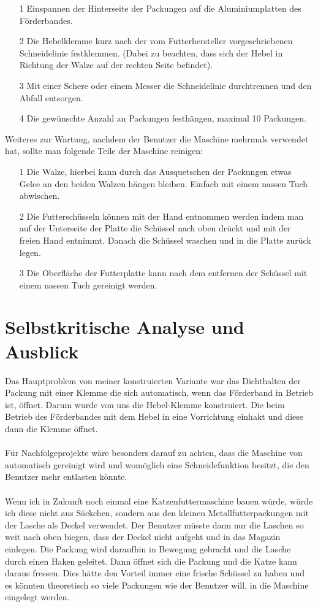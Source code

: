 \begin{itemize}
\item[1] Einspannen der Hinterseite der Packungen auf die Aluminiumplatten des Förderbandes. 
\item[2] Die Hebelklemme kurz nach der vom Futterhersteller vorgeschriebenen Schneidelinie festklemmen. (Dabei zu beachten, dass sich der Hebel in Richtung der Walze auf der rechten Seite befindet).
\item[3] Mit einer Schere oder einem Messer die Schneidelinie durchtrennen und den Abfall entsorgen.
\item[4] Die gewünschte Anzahl an Packungen festhängen, maximal 10 Packungen.
\end{itemize} 

Weiteres zur Wartung, nachdem der Benutzer die Maschine mehrmals verwendet hat, sollte man folgende Teile der Maschine reinigen: 

\begin{itemize}
\item[1] Die Walze, hierbei kann durch das Ausquetschen der Packungen etwas Gelee an den beiden Walzen hängen bleiben. Einfach mit einem nassen Tuch abwischen.
\item[2] Die Futterschüsseln können mit der Hand entnommen werden indem man auf der Unterseite der Platte die Schüssel nach oben drückt und mit der freien Hand entnimmt. Danach die Schüssel waschen und in die Platte zurück legen.
\item[3] Die Oberfläche der Futterplatte kann nach dem entfernen der Schüssel mit einem nassen Tuch gereinigt werden.
\end{itemize}


\section{Selbstkritische Analyse und Ausblick}

Das Hauptproblem von meiner konstruierten Variante war das Dichthalten der Packung mit einer Klemme die sich automatisch, wenn das Förderband in Betrieb ist, öffnet. Darum wurde von uns die Hebel-Klemme konstruiert. Die beim Betrieb des Förderbandes mit dem Hebel in eine Vorrichtung einhakt und diese dann die Klemme öffnet. \\
\\
Für Nachfolgeprojekte wäre besonders darauf zu achten, dass die Maschine von automatisch gereinigt wird und womöglich eine Schneidefunktion besitzt, die den Benutzer mehr entlasten könnte.\\
\\
Wenn ich in Zukunft noch einmal eine Katzenfuttermaschine bauen würde, würde ich diese nicht aus Säckchen, sondern aus den kleinen Metallfutterpackungen mit der Lasche als Deckel verwendet. Der Benutzer müsste dann nur die Laschen so weit nach oben biegen, dass der Deckel nicht aufgeht und in das Magazin einlegen. Die Packung wird daraufhin in Bewegung gebracht und die Lasche durch einen Haken geleitet. Dann öffnet sich die Packung und die Katze kann daraus fressen. Dies hätte den Vorteil immer eine frische Schüssel zu haben und es könnten theoretisch so viele Packungen wie der Benutzer will, in die Maschine eingelegt werden. \\
 
